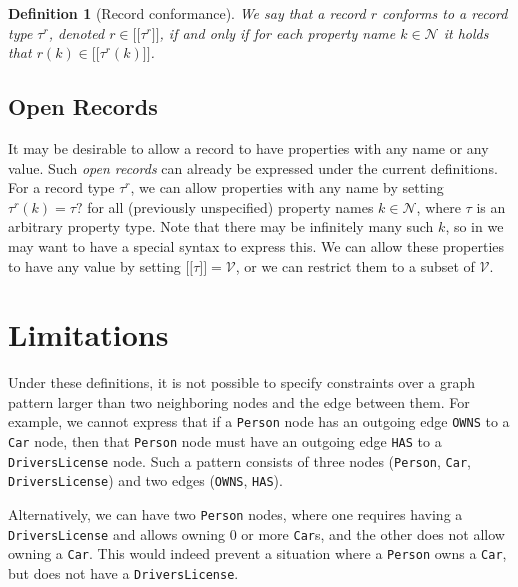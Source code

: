\documentclass[a4paper]{article}
\newtheorem{definition}[theorem]{Definition}
\newcommand{\ptype}{\tau}
\newcommand{\rtype}{\tau^r}
\newcommand{\lsem}{\ensuremath{[\![}}
\newcommand{\rsem}{\ensuremath{]\!]}}
\newcommand{\sem}[1]{\ensuremath{\lsem #1 \rsem}}
\begin{document}
\begin{definition}[Record conformance]
  We say that a record $r$ \emph{conforms} to a record type $\rtype$, denoted $r \in \sem{\rtype}$, if and only if for each property name $k \in \mathcal{N}$ it holds that $r(k) \in \sem{\rtype(k)}$.
\end{definition}

\subsection{Open Records}

It may be desirable to allow a record to have properties with any name or any value. Such \emph{open records} can already be expressed under the current definitions. For a record type $\rtype$, we can allow properties with any name by setting $\rtype(k) = \ptype?$ for all (previously unspecified) property names $k \in \mathcal{N}$, where $\ptype$ is an arbitrary property type. Note that there may be infinitely many such $k$, so in we may want to have a special syntax to express this. We can allow these properties to have any value by setting $\sem{\ptype} = \mathcal{V}$, or we can restrict them to a subset of $\mathcal{V}$.

\section{Limitations}

Under these definitions, it is not possible to specify constraints over a graph pattern larger than two neighboring nodes and the edge between them. For example, we cannot express that if a \texttt{Person} node has an outgoing edge \texttt{OWNS} to a \texttt{Car} node, then that \texttt{Person} node must have an outgoing edge \texttt{HAS} to a \texttt{DriversLicense} node. Such a pattern consists of three nodes (\texttt{Person}, \texttt{Car}, \texttt{DriversLicense}) and two edges (\texttt{OWNS}, \texttt{HAS}).

Alternatively, we can have two \texttt{Person} nodes, where one requires having a \texttt{DriversLicense} and allows owning 0 or more \texttt{Car}s, and the other does not allow owning a \texttt{Car}. This would indeed prevent a situation where a \texttt{Person} owns a \texttt{Car}, but does not have a \texttt{DriversLicense}.

\end{document}
